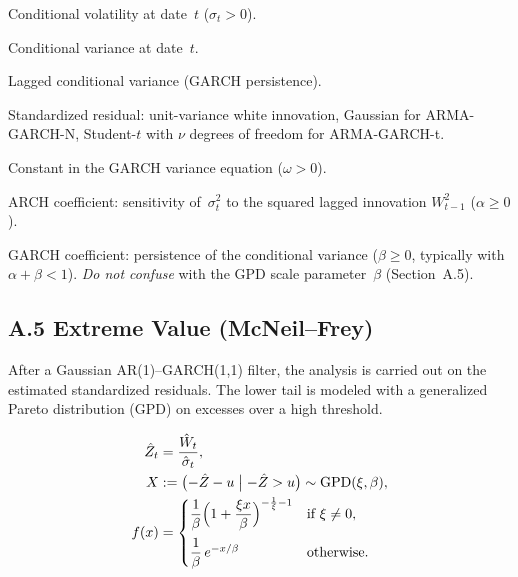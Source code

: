\begin{description}[style=nextline,leftmargin=2.2cm,labelwidth=2cm]
  \item[$\sigma_t$]
    Conditional volatility at date~$t$ ($\sigma_t > 0$).
  \item[$\sigma_t^2$]
    Conditional variance at date~$t$.
  \item[$\sigma_{t-1}^2$]
    Lagged conditional variance (GARCH persistence).
  \item[$Z_t$]
    Standardized residual: unit-variance white innovation,
    Gaussian for ARMA-GARCH-N, Student-$t$ with $\nu$ degrees of freedom for ARMA-GARCH-t.
  \item[$\omega$]
    Constant in the GARCH variance equation ($\omega > 0$).
  \item[$\alpha$]
    ARCH coefficient: sensitivity of~$\sigma_t^2$ to the squared lagged innovation
    $W_{t-1}^2$ ($\alpha \geq 0$).
  \item[$\beta$]
    GARCH coefficient: persistence of the conditional variance
    ($\beta \geq 0$, typically with $\alpha + \beta < 1$).
    \emph{Do not confuse} with the GPD scale parameter~$\beta$ (Section~A.5).
\end{description}

\subsection*{A.5 Extreme Value (McNeil--Frey)}

After a Gaussian AR(1)--GARCH(1,1) filter, the analysis is carried out on the estimated standardized residuals.
The lower tail is modeled with a generalized Pareto distribution (GPD) on excesses over a high threshold.

\begin{align*}
  \hat{Z}_t &= \frac{\hat{W}_t}{\hat{\sigma}_t}, \\
  X &:= \bigl(-\hat{Z} - u \bigm| -\hat{Z} > u\bigr) \sim \mathrm{GPD}(\xi,\beta), \\
  f(x) &=
  \begin{cases}
    \dfrac{1}{\beta}\Bigl(1 + \dfrac{\xi x}{\beta}\Bigr)^{-\frac{1}{\xi}-1}
      & \text{if } \xi \neq 0, \\[1em]
    \dfrac{1}{\beta}\, e^{-x/\beta}
      & \text{otherwise.}
  \end{cases}
\end{align*}

